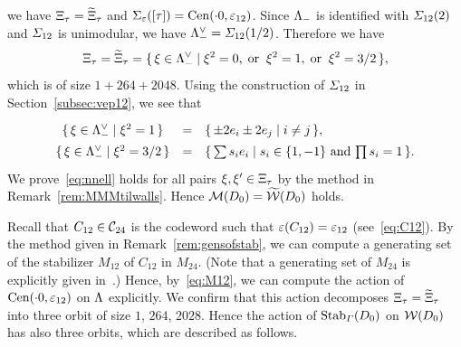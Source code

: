 \documentclass{amsart} %
\begin{document}
we have $\Xi_{\tau}=\widetilde{\Xi}_{\tau}$ and $\Sigma_{\varepsilon}([\tau])=\mathrm{Cen}(\cdot 0, \varepsilon_{12})$.
Since $\Lambda_{-}$ is identified with $\varSigma_{12}(2)$ and $\varSigma_{12}$ is unimodular,
we have $\Lambda_{-}^{\vee}= \varSigma_{12}(1/2)$.
Therefore we have 
\[
\Xi_{\tau}=\widetilde{\Xi}_{\tau}=\{\,{\xi\in \Lambda_{-}^{\vee}}\mid {\xi^2=0, \;\textrm{or}\; \; \xi^2=1, \;\textrm{or}\; \; \xi^2=3/2} \,\},
\]
which is of size $1+264+2048$.
Using the construction of $\varSigma_{12}$ in Section~\ref{subsec:vep12},
we see that 
\[
\renewcommand{\arraystretch}{1.4}
\begin{array}{ccl}
\set{\xi\in \Leechminus\dual}{\xi^2=1} &=& \set{\pm 2 e_i\pm 2 e_j}{i\ne j}, \\
\set{\xi\in \Leechminus\dual}{\xi^2=3/2} &=& \set{\sum s_i e_i}{\textrm{$s_i\in \{1, -1\}$ and $\prod s_i=1$}}. \\
\end{array}
\]
%
%
We prove~\eqref{eq:nnell} holds for all pairs $\xi, \xi^{\prime}\in \Xi_{\tau}$
by the method in Remark~\ref{rem:MMMtilwalls}.
Hence 
$\mathord{\mathcal{M}}(D_0)=\widetilde{\mathord{\mathcal{W}}}(D_0)$ holds.
%
\par 
%
Recall that $C_{12}\in \mathord{\mathcal{C}}_{24}$ is the codeword such that $\varepsilon(C_{12})=\varepsilon_{12}$ (see~\eqref{eq:C12}).
By the method given in Remark~\ref{rem:gensofstab}, 
we can compute a generating set of 
the stabilizer $M_{12}$ of $C_{12}$ in $M_{24}$.
(Note that a generating set of $M_{24}$ is explicitly given in~\cite[Chapter 10, Section 2]{theCSbook}.)
Hence, by~\eqref{eq:M12},
we can compute the action of $\mathrm{Cen}(\cdot 0, \varepsilon_{12})$ on $\Lambda$ explicitly.
We confirm that this action decomposes $\Xi_{\tau}=\widetilde{\Xi}_{\tau}$
into three orbit of size $1$, $264$, $2028$.
Hence the action of $\operatorname{Stab}_{\varGamma}(D_0)$ on $\mathord{\mathcal{W}}(D_0)$ 
has also three orbits,
which are described as follows.
%
\end{document}
